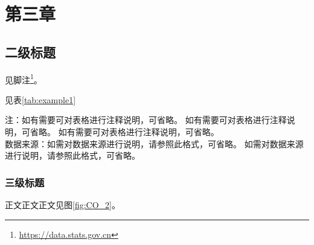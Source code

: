 
\chapter{第三章}
\zhlipsum

\section{二级标题}
见脚注\footnote{\url{https://data.stats.gov.cn}}。
\zhlipsum

见表\ref{tab:example1}\zhlipsum[1]

\begin{table}[H]
  \small
  \caption{表格标题表格标题表格标题\label{tab:example1}}
  \vspace{1.5ex}
  \begin{minipage}{\textwidth}
    \phantom{缩进}注：如有需要可对表格进行注释说明，可省略。
    如有需要可对表格进行注释说明，可省略。
    如有需要可对表格进行注释说明，可省略。\\
    \phantom{缩进}数据来源：如需对数据来源进行说明，请参照此格式，可省略。
    如需对数据来源进行说明，请参照此格式，可省略。
  \end{minipage}
\end{table}%
\vspace{-3ex}
\zhlipsum

\subsection{三级标题}
\zhlipsum*[2] 正文正文正文见图\ref{fig:CO_2}。

